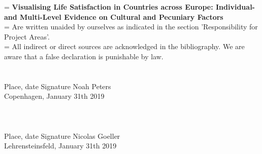 \documentclass[preprint,12pt,authoryear]{elsarticle}
\begin{document}
	\hangindent=\parindent
	\parindent 0pt
	\textbf{Visualising Life Satisfaction in Countries across Europe: Individual- and Multi-Level Evidence on Cultural and Pecuniary Factors} 
	\\
	
	\hangindent=\parindent
	\parindent 0pt
	Are written unaided by ourselves as indicated in the section 'Responsibility for Project Areas'. 
	\\
	
	\hangindent=\parindent
	\parindent 0pt
	All indirect or direct sources are acknowledged in the bibliography. We are aware that a false declaration is punishable by law. 
	\\
	\\
	\\
	Place, date                                         	Signature Noah Peters
	\\
	Copenhagen, January 31th 2019\\
	\\
	\\
	\\
	Place, date												Signature Nicolas Goeller
	\\
	Lehrensteinsfeld, January 31th 2019
	
	
	
	
\end{document}

